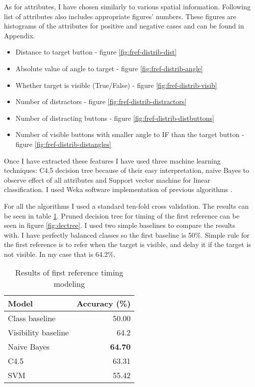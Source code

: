 As for attributes, I have chosen similarly to \citet{stoia2006sentence} various spatial information. Following list of attributes also includes appropriate figures' numbers. These figures are histograms of the attributes for positive and negative cases and can be found in Appendix.

\begin{itemize}
\item
Distance to target button - figure \ref{fig:fref-distrib-dist}
\item
Absolute value of angle to target - figure \ref{fig:fref-distrib-angle}
\item
Whether target is visible (True/False) - figure \ref{fig:fref-distrib-visib}
\item
Number of distractors - figure \ref{fig:fref-distrib-distractors}
\item
Number of distracting buttons - figure \ref{fig:fref-distrib-distbuttons}
\item
Number of visible buttons with smaller angle to IF than the target button - figure \ref{fig:fref-distrib-distangles}
\end{itemize}

Once I have extracted these features I have used three machine learning techniques: C4.5 decision tree because of their easy interpretation, naive Bayes to observe effect of all attributes and Support vector machine for linear classification. I used Weka software implementation of previous algorithms \citep{hall2009weka}.

For all the algorithms I used a standard ten-fold cross validation. The results can be seen in table \ref{tab:firstref}. Pruned decision tree for timing of the first reference can be seen in figure \ref{fig:dectree}. I used two simple baselines to compare the results with. I have perfectly balanced classes so the first baseline is 50\%. Simple rule for the first reference is to refer when the target is visible, and delay it if the target is not visible. In my case that is 64.2\%. 

\begin{table}[h!]
\begin{tabular}{lr}
\toprule
Model    & Accuracy (\%)  \\
\midrule
Class baseline    & 50.00\\
Visibility baseline & 64.2\\
\midrule
Naive Bayes  & \textbf{64.70} \\
C4.5 & 63.31 \\
SVM & 55.42 \\
\bottomrule
\end{tabular}
\caption{Results of first reference timing modeling}
\label{tab:firstref}
\end{table}

